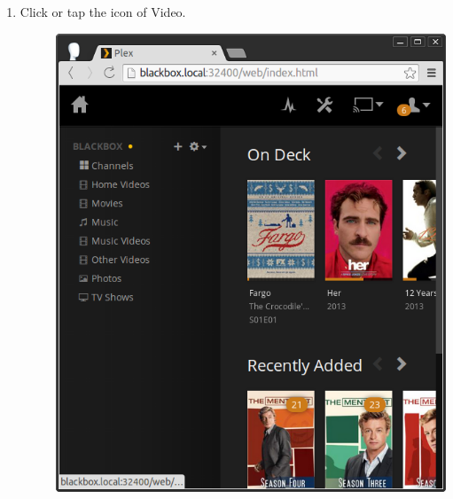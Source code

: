 \documentclass[letterpaper,10pt,english]{sphinxmanual}
\begin{document}
\begin{enumerate}
\item {} \begin{description}
\item[{Click or tap the icon of Video.}] \leavevmode
\includegraphics{plex.png}

\end{description}

\end{enumerate}
\end{document}
